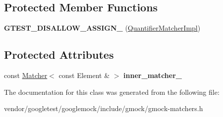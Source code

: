 \subsection*{Protected Member Functions}
\begin{DoxyCompactItemize}
\item 
\mbox{\label{classtesting_1_1internal_1_1_quantifier_matcher_impl_ad57fcd1799e59217fe40c0144ff024f1}} 
{\bfseries G\+T\+E\+S\+T\+\_\+\+D\+I\+S\+A\+L\+L\+O\+W\+\_\+\+A\+S\+S\+I\+G\+N\+\_\+} (\hyperlink{classtesting_1_1internal_1_1_quantifier_matcher_impl}{Quantifier\+Matcher\+Impl})
\end{DoxyCompactItemize}
\subsection*{Protected Attributes}
\begin{DoxyCompactItemize}
\item 
\mbox{\label{classtesting_1_1internal_1_1_quantifier_matcher_impl_af0ee2a4697f5cb8e937fd29dd75e2a30}} 
const \hyperlink{classtesting_1_1_matcher}{Matcher}$<$ const Element \& $>$ {\bfseries inner\+\_\+matcher\+\_\+}
\end{DoxyCompactItemize}


The documentation for this class was generated from the following file\+:\begin{DoxyCompactItemize}
\item 
vendor/googletest/googlemock/include/gmock/gmock-\/matchers.\+h\end{DoxyCompactItemize}
